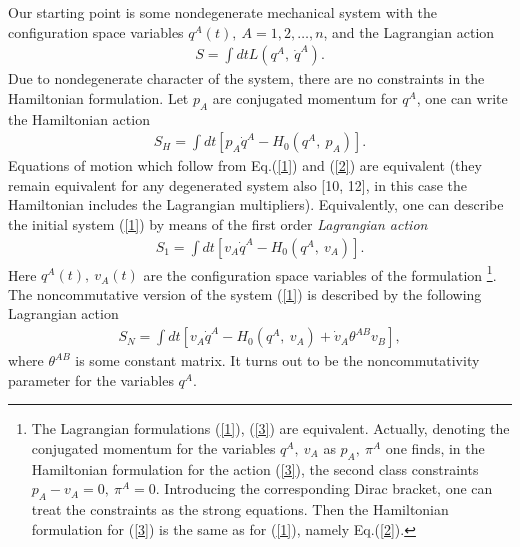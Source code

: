 \documentclass[paper a4]{article}
\begin{document}
Our starting point is some nondegenerate
mechanical system with the configuration space variables $q^A(t), ~
A=1,2, \ldots , n$, and the Lagrangian action
\begin{eqnarray}\label{1}
S=\int dt L(q^A, ~ \dot q^A).
\end{eqnarray}
Due to nondegenerate character of the system, there are no constraints
in the Hamiltonian formulation. Let $p_A$ are conjugated momentum for
$q^A$, one can write the Hamiltonian action
\begin{eqnarray}\label{2}
S_H=\int dt \left[ p_A\dot q^A-H_0(q^A, ~ p_A)\right].
\end{eqnarray}
Equations of motion which follow from Eq.(\ref{1}) and (\ref{2}) are
equivalent (they remain equivalent for any degenerated system also
[10, 12], in this case the Hamiltonian includes the Lagrangian
multipliers). Equivalently,
one can describe the initial system (\ref{1}) by means of the first order
{\em Lagrangian action}
\begin{eqnarray}\label{3}
S_1=\int dt \left[v_A\dot q^A-H_0(q^A, ~ v_A)\right].
\end{eqnarray}
Here $q^A(t), ~ v_A(t)$ are the configuration space variables of the
formulation \footnote{The Lagrangian formulations (\ref{1}), (\ref{3})
are equivalent. Actually, denoting the conjugated momentum for the
variables $q^A, ~ v_A$ as $p_A, ~ \pi^A$ one finds, in the Hamiltonian
formulation for the action (\ref{3}), the second class constraints
$p_A-v_A=0, ~ \pi^A=0$. Introducing the corresponding Dirac bracket,
one can treat the constraints as the strong equations. Then the
Hamiltonian formulation for (\ref{3}) is the same as for (\ref{1}),
namely Eq.(\ref{2}).}.
The noncommutative version of the system (\ref{1}) is described by the
following Lagrangian action
\begin{eqnarray}\label{4}
S_N=\int dt \left[v_A\dot q^A-H_0(q^A, ~ v_A)+
\dot v_A\theta^{AB}v_B \right],
\end{eqnarray}
where $\theta^{AB}$ is some constant matrix. It turns out to be the
noncommutativity parameter for the variables $q^A$.
\end{document}
